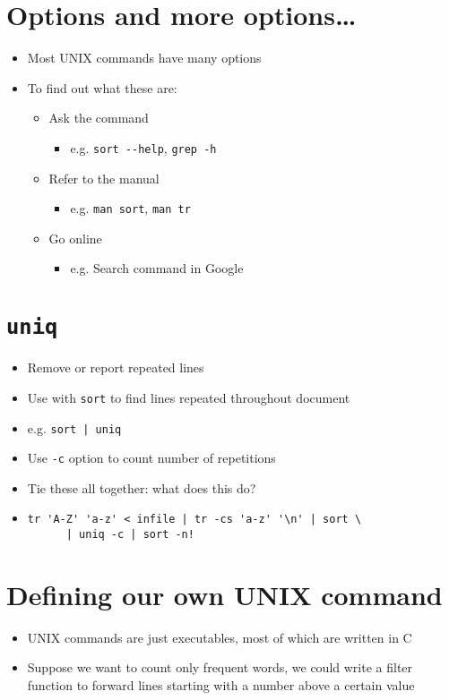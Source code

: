 \documentclass{article}
\begin{document}
\section{Options and more options\ldots}
\begin{itemize}
\item Most UNIX commands have many options
\item To find out what these are:
\begin{itemize}
\item Ask the command
\begin{itemize}
\item e.g. \verb!sort --help!, \verb!grep -h!
\end{itemize}
\item Refer to the manual
\begin{itemize}
\item e.g. \verb!man sort!, \verb!man tr!
\end{itemize}
\item Go online
\begin{itemize}
\item e.g. Search command in Google
\end{itemize}
\end{itemize}
\end{itemize}



\section{\texttt{uniq}}
\begin{itemize}
\item Remove or report repeated lines
\item Use with \verb!sort! to find lines repeated throughout document
\item e.g. \verb!sort | uniq!
\item Use \verb!-c! option to count number of repetitions
\item Tie these all together: what does this do?
\item 
\begin{verbatim}
tr 'A-Z' 'a-z' < infile | tr -cs 'a-z' '\n' | sort \
      | uniq -c | sort -n!
\end{verbatim}
\end{itemize}



\section{Defining our own UNIX command}
\begin{itemize}
\item UNIX commands are just executables, most of which are written in C
\item Suppose we want to count only frequent words, we could write a filter function to forward lines starting with a number above a certain value
\end{itemize}
\end{document}
